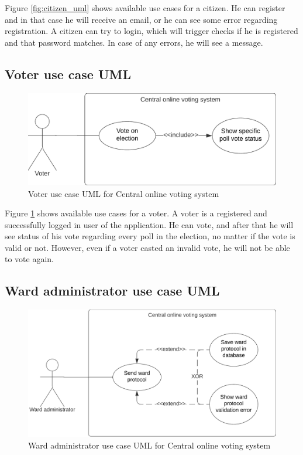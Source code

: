 \documentclass[a4paper,twoside,12pt]{book}
\newcommand{\Title}{Central online voting system}
\begin{document}
    Figure \ref{fig:citizen_uml} shows available use cases for a citizen. He can register and in that case he will receive an email, 
    or he can see some error regarding registration. A citizen can try to login, which will trigger checks if he is registered and that password matches.
    In case of any errors, he will see a message. 

    \subsection{Voter use case UML}
    \begin{figure}[h]
      \includegraphics[width=\linewidth]{voter_uml.png}
      \caption{Voter use case UML for \Title}
      \label{fig:voter_uml}
    \end{figure}

    Figure \ref{fig:voter_uml} shows available use cases for a voter. A voter is a registered and successfully logged in user of the application.
    He can vote, and after that he will see status of his vote regarding every poll in the election, no matter if the vote is valid or not.
    However, even if a voter casted an invalid vote, he will not be able to vote again.

    \subsection{Ward administrator use case UML}
    \begin{figure}[h]
      \centering
      \includegraphics[width=0.65\linewidth]{ward_admin_uml.png}
      \caption{Ward administrator use case UML for \Title}
      \label{fig:ward_admin_uml}
    \end{figure}
\end{document}
